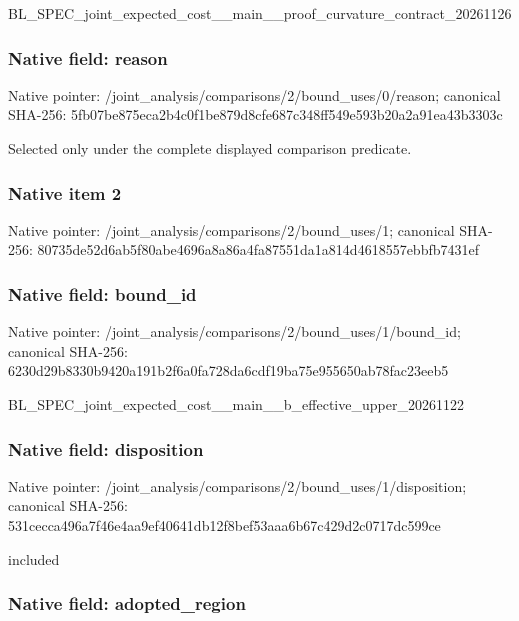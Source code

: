 \documentclass[10pt,a4paper]{article}
\begin{document}
BL\_SPEC\_joint\_expected\_c\allowbreak{}ost\_\_main\_\_proof\_curvatu\allowbreak{}re\_contract\_20261126


\subsubsection{Native field: reason}


Native pointer: /joint\_analysis/comparis\allowbreak{}ons/2/bound\_uses/0/reaso\allowbreak{}n; canonical SHA-256: 5fb07be875eca2b4c0f1be87\allowbreak{}9d8cfe687c348ff549e593b2\allowbreak{}0a2a91ea43b3303c


Selected only under the complete displayed comparison predicate.


\subsubsection{Native item 2}


Native pointer: /joint\_analysis/comparis\allowbreak{}ons/2/bound\_uses/1; canonical SHA-256: 80735de52d6ab5f80abe4696\allowbreak{}a8a86a4fa87551da1a814d46\allowbreak{}18557ebbfb7431ef



\subsubsection{Native field: bound\_id}


Native pointer: /joint\_analysis/comparis\allowbreak{}ons/2/bound\_uses/1/bound\allowbreak{}\_id; canonical SHA-256: 6230d29b8330b9420a191b2f\allowbreak{}6a0fa728da6cdf19ba75e955\allowbreak{}650ab78fac23eeb5


BL\_SPEC\_joint\_expected\_c\allowbreak{}ost\_\_main\_\_b\_effective\_u\allowbreak{}pper\_20261122


\subsubsection{Native field: disposition}


Native pointer: /joint\_analysis/comparis\allowbreak{}ons/2/bound\_uses/1/dispo\allowbreak{}sition; canonical SHA-256: 531cecca496a7f46e4aa9ef4\allowbreak{}0641db12f8bef53aaa6b67c4\allowbreak{}29d2c0717dc599ce


included


\subsubsection{Native field: adopted\_region}
\end{document}

